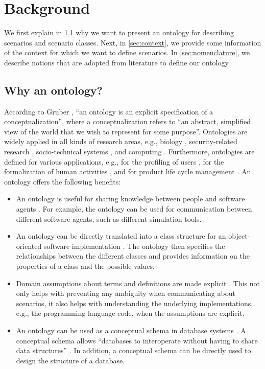 \section{Background}
\label{sec:background}

We first explain in \cref{sec:why ontology} why we want to present an ontology for describing scenarios and scenario classes. Next, in \cref{sec:context}, we provide some information of the context for which we want to define scenarios. In \cref{sec:nomenclature}, we describe notions that are adopted from literature to define our ontology.



\subsection{Why an ontology?}
\label{sec:why ontology}
According to Gruber \cite{gruber1993ontology}, ``an ontology is an explicit specification of a conceptualization'', where a conceptualization refers to ``an abstract, simplified view of the world that we wish to represent for some purpose''. Ontologies are widely applied in all kinds of research areas, e.g., biology \cite{gkoutos2004mouse}, security-related research \cite{kim2005security}, socio-technical systems \cite{vanDamPhDThesis2009}, and computing \cite{chen2004soupa,chen2003ontology}. Furthermore, ontologies are defined for various applications, e.g., for the profiling of users \cite{golemati2007creating}, for the formalization of human activities \cite{lee2017location}, and for product life cycle management \cite{matsokis2010plm}. An ontology offers the following benefits:
\begin{itemize}
	\item An ontology is useful for sharing knowledge between people and software agents \cite{vanDamPhDThesis2009, noy2001ontology, musen1992dimensions}. For example, the ontology can be used for communication between different software agents, such as different simulation tools.
	\item An ontology can be directly translated into a class structure for an object-oriented software implementation \cite{vanDamPhDThesis2009}. The ontology then specifies the relationships between the different classes and provides information on the properties of a class and the possible values.
	\item Domain assumptions about terms and definitions are made explicit \cite{noy2001ontology}. This not only helps with preventing any ambiguity when communicating about scenarios, it also helps with understanding the underlying implementations, e.g., the programming-language code, when the assumptions are explicit.
	\item An ontology can be used as a conceptual schema in database systems  \cite{gruber1993ontology}. A conceptual schema allows ``databases to interoperate without having to share data structures'' \cite{gruber1993ontology}. In addition, a conceptual schema can be directly used to design the structure of a database.
\end{itemize}

